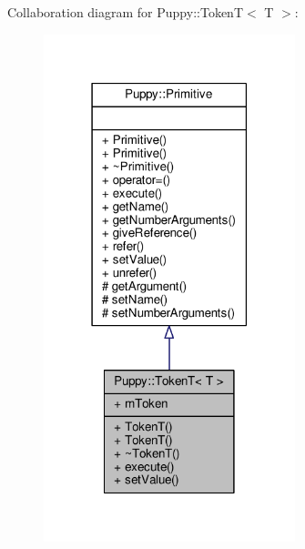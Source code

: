 Collaboration diagram for Puppy\+:\+:Token\+T$<$ T $>$\+:
\nopagebreak
\begin{figure}[H]
\begin{center}
\leavevmode
\includegraphics[width=207pt]{classPuppy_1_1TokenT__coll__graph}
\end{center}
\end{figure}
